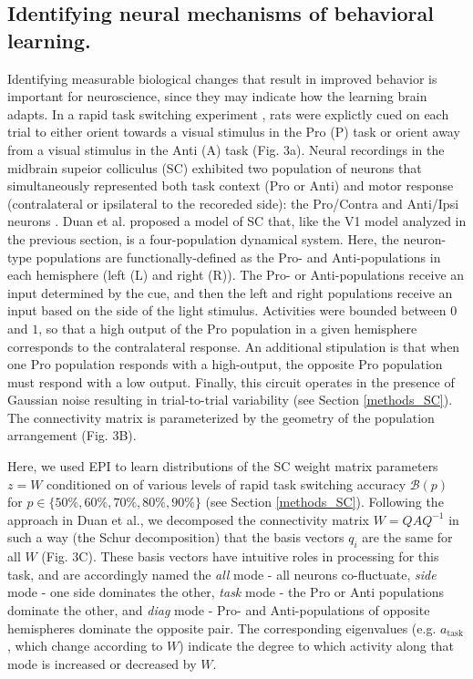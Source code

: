 \documentclass[11pt]{article}
\begin{document}
\subsection{Identifying neural mechanisms of behavioral learning.} \label{results_SC}
Identifying measurable biological changes that result in improved behavior is important for neuroscience, since they may indicate how the learning brain adapts.
In a rapid task switching experiment \cite{duan2015requirement}, rats were explictly cued on each trial to either orient towards a visual stimulus in the Pro (P) task or orient away from a visual stimulus in the Anti (A) task (Fig. 3a). Neural recordings in the midbrain supeior colliculus (SC) exhibited two population of neurons that simultaneously represented both task context (Pro or Anti) and motor response (contralateral or ipsilateral to the recoreded side): the Pro/Contra and Anti/Ipsi neurons \cite{duan2018collicular}.
Duan et al. proposed a model of SC that, like the V1 model analyzed in the previous section, is a four-population dynamical system.  
Here, the neuron-type populations are functionally-defined as the Pro- and Anti-populations in each hemisphere (left (L) and right (R)).  
The Pro- or Anti-populations receive an input determined by the cue, and then the left and right populations receive an input based on the side of the light stimulus. 
Activities were bounded between $0$ and $1$, so that a high output of the Pro population in a given hemisphere corresponds to the contralateral response.   
An additional stipulation is that when one Pro population responds with a high-output, the opposite Pro population must respond with a low output.
Finally, this circuit operates in the presence of Gaussian noise resulting in trial-to-trial variability (see Section \ref{methods_SC}).
The connectivity matrix is parameterized by the geometry of the population arrangement (Fig. 3B).  

Here, we used EPI to learn distributions of the SC weight matrix parameters $z = W$ conditioned on of various levels of rapid task switching accuracy $\mathcal{B}(p)$ for $p \in \{50\%, 60\%, 70\%, 80\%, 90\%\}$ (see Section \ref{methods_SC}).  Following the approach in Duan et al., we decomposed the connectivity matrix $W = QAQ^{-1}$ in such a way (the Schur decomposition) that the basis vectors $q_i$ are the same for all $W$ (Fig. 3C). These basis vectors have intuitive roles in processing for this task, and are accordingly named the \textit{all} mode - all neurons co-fluctuate, \textit{side} mode - one side dominates the other, \textit{task} mode - the Pro or Anti populations dominate the other, and \textit{diag} mode - Pro- and Anti-populations of opposite hemispheres dominate the opposite pair. The corresponding eigenvalues (e.g. $a_{\text{task}}$, which change according to $W$) indicate the degree to which activity along that mode is increased or decreased by $W$.  
\end{document}
